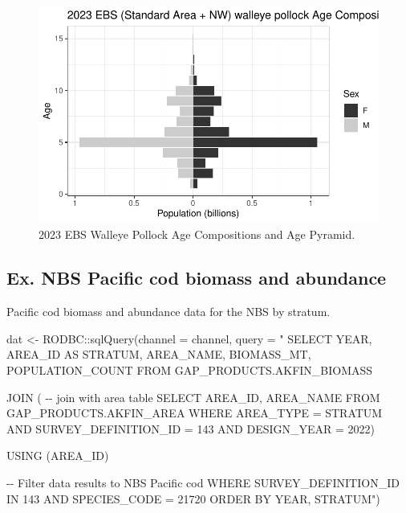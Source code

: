\documentclass[
  letterpaper,
  oneside,
  open=any]{scrbook}
\newenvironment{Shaded}{\begin{snugshade}}{\end{snugshade}}
\newcommand{\AttributeTok}[1]{\textcolor[rgb]{0.40,0.45,0.13}{#1}}
\newcommand{\FunctionTok}[1]{\textcolor[rgb]{0.28,0.35,0.67}{#1}}
\newcommand{\NormalTok}[1]{\textcolor[rgb]{0.00,0.23,0.31}{#1}}
\newcommand{\OtherTok}[1]{\textcolor[rgb]{0.00,0.23,0.31}{#1}}
\newcommand{\SpecialCharTok}[1]{\textcolor[rgb]{0.37,0.37,0.37}{#1}}
\newcommand{\StringTok}[1]{\textcolor[rgb]{0.13,0.47,0.30}{#1}}
\begin{document}
\begin{figure}[H]

{\centering \includegraphics{content/akfin-oracle-sql-r_files/figure-pdf/test-3-plot-1.pdf}

}

\caption{2023 EBS Walleye Pollock Age Compositions and Age Pyramid.}

\end{figure}%

\subsection{Ex. NBS Pacific cod biomass and
abundance}\label{ex.-nbs-pacific-cod-biomass-and-abundance}

Pacific cod biomass and abundance data for the NBS by stratum.

\begin{Shaded}
\begin{Highlighting}[]
\NormalTok{dat }\OtherTok{\textless{}{-}}\NormalTok{ RODBC}\SpecialCharTok{::}\FunctionTok{sqlQuery}\NormalTok{(}\AttributeTok{channel =}\NormalTok{ channel, }
                       \AttributeTok{query =} 
                         \StringTok{"}
\StringTok{SELECT YEAR, AREA\_ID AS STRATUM, AREA\_NAME, BIOMASS\_MT, POPULATION\_COUNT }
\StringTok{FROM GAP\_PRODUCTS.AKFIN\_BIOMASS}

\StringTok{JOIN ( {-}{-} join with area table}
\StringTok{SELECT AREA\_ID, AREA\_NAME}
\StringTok{FROM GAP\_PRODUCTS.AKFIN\_AREA}
\StringTok{WHERE AREA\_TYPE = \textquotesingle{}STRATUM\textquotesingle{}}
\StringTok{AND SURVEY\_DEFINITION\_ID = 143}
\StringTok{AND DESIGN\_YEAR = 2022)}

\StringTok{USING (AREA\_ID)}

\StringTok{{-}{-} Filter data results to NBS Pacific cod}
\StringTok{WHERE SURVEY\_DEFINITION\_ID IN 143 }
\StringTok{AND SPECIES\_CODE = 21720}
\StringTok{ORDER BY YEAR, STRATUM"}\NormalTok{)}
\end{Highlighting}
\end{Shaded}
\end{document}
